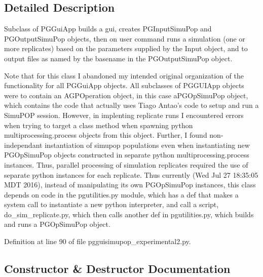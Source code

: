 \subsection{Detailed Description}
\begin{DoxyVerb}Subclass of PGGuiApp builds a gui,
creates PGInputSimuPop and PGOutputSimuPop
objects, then on user command runs a simulation 
(one or more replicates) based on the parameters 
supplied by the Input object, and to output files 
as named by the basename in the PGOutputSimuPop object.  

Note that for this class I abandoned my intended original 
organization of the functionality for all  PGGuiApp objects.
All subclasses of PGGUIApp objects were to contain an 
AGPOperation object, in this case aPGOpSimuPop object, 
which contains the code that actually uses Tiago Antao's 
code to setup and run a SimuPOP session.  However, in 
implenting replicate runs I encountered errors when
trying to target a class method when spawning python
multiprocessing.process objects from this object.  Further,
I found non-independant instantiation of simupop populations 
even when instantiating new PGOpSimuPop objects constructed
in separate python multiprocessing.process instances.   
Thus, parallel processing of simulation replicates required 
the use of separate python instances for each replicate. 
Thus currently (Wed Jul 27 18:35:05 MDT 2016),
instead of manipulating its own PGOpSimuPop instances,
this class depends on code in the pgutilities.py
module, which has a def that makes a system call to 
instantiate a new python interpreter, and call a script,
do_sim_replicate.py, which then calls another def in 
pgutilities.py, which builds and runs a PGOpSimuPop object.\end{DoxyVerb}
 

Definition at line 90 of file pgguisimupop\+\_\+experimental2.\+py.



\subsection{Constructor \& Destructor Documentation}
